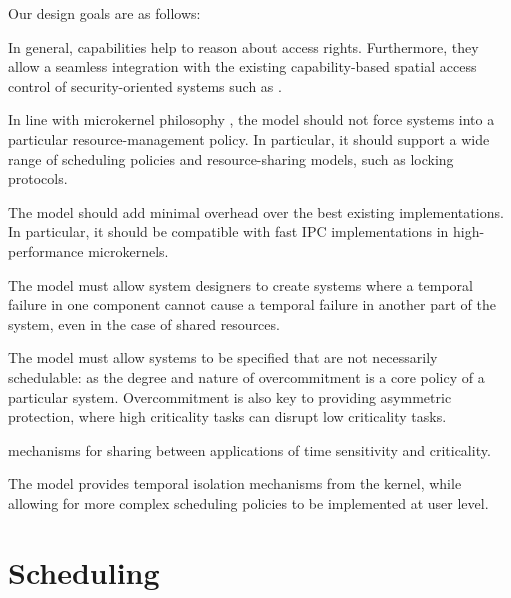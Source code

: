 Our design goals are as follows:
\begin{description}\sloppy
    \item[Capability-controlled enforcement of time limits:] In general, capabilities
      help to reason about access rights. Furthermore, they allow a
        seamless integration with the existing capability-based spatial
          access control of security-oriented systems such as \selfour.
    \item[Policy freedom:] In line with microkernel philosophy
        \citep{Heiser_Elphinstone_16}, the model should not force systems
        into a particular resource-management policy. In particular, it
        should support a wide range of scheduling policies and
        resource-sharing models, such as locking protocols.
    \item[Efficient:] The model should add minimal overhead over the best
                      existing implementations. In particular, it should be compatible
                        with fast IPC implementations in high-performance microkernels.

    \item[Temporal isolation:] The model must allow system designers to create systems where a
        temporal failure in one component cannot cause a temporal failure in another part of the
        system, even in the case of shared resources.

    \item[Overcommitment:] The model must allow systems to be specified that are not necessarily
        schedulable: as the degree and nature of overcommitment is a core policy of a particular
        system. Overcommitment is also key to providing  asymmetric protection, where high
        criticality tasks can disrupt low criticality tasks.

    \item[Safe resource sharing:] mechanisms for sharing between applications of time sensitivity
        and criticality.
\end{description}

The model  provides temporal isolation mechanisms from the kernel, while allowing for more complex
scheduling policies to be implemented at user level.

\section{Scheduling}

